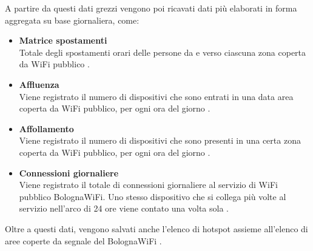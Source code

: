 A partire da questi dati grezzi vengono poi ricavati dati più elaborati in forma aggregata su base giornaliera, come:
\begin{itemize}
    \item \textbf{Matrice spostamenti}\\
    Totale degli spostamenti orari delle persone da e verso ciascuna zona coperta da WiFi pubblico \cite{BolognaWiFi_Spostamenti}.
    \item \textbf{Affluenza}\\
    Viene registrato il numero di dispositivi che sono entrati in una data area coperta da WiFi pubblico, per ogni ora del giorno \cite{BolognaWiFi_Affluenza}.
    \item \textbf{Affollamento}\\
    Viene registrato il numero di dispositivi che sono presenti in una certa zona coperta da WiFi pubblico, per ogni ora del giorno \cite{BolognaWiFi_Affollamento}.
    \item \textbf{Connessioni giornaliere}\\
    Viene registrato il totale di connessioni giornaliere al servizio di WiFi pubblico BolognaWiFi. Uno stesso dispositivo che si collega più volte al servizio nell'arco di 24 ore viene contato una volta sola \cite{BolognaWiFi_Connessioni_Giornaliere}.
\end{itemize}
Oltre a questi dati, vengono salvati anche l'elenco di hotspot \cite{BolognaWiFi_Elenco_Hotspot} assieme all'elenco di aree coperte da segnale del BolognaWiFi \cite{BolognaWiFi_Elenco_Aree_Segnale}.





